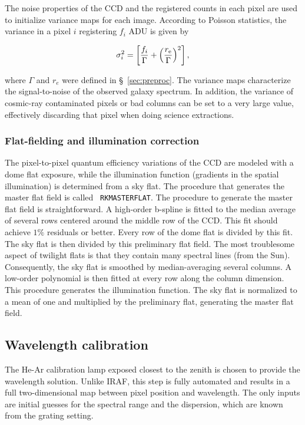 \documentclass[12pt,preprint]{aastex}
\begin{document}
The noise properties of the CCD and the registered counts in each
pixel are used to initialize variance maps for each image.  According
to Poisson statistics, the variance in a pixel $i$ registering $f_{i}$
ADU is given by

\begin{equation}
\sigma_{i}^{2} = \left[ \frac{f_{i}}{\Gamma} + \left(\frac{r_{\rm
e}}{\Gamma}\right)^{2} \right],
\end{equation}

\noindent where $\Gamma$ and $r_{e}$ were defined in
\S~\ref{sec:preproc}.  The variance maps characterize the
signal-to-noise of the observed galaxy spectrum.  In addition, the
variance of cosmic-ray contaminated pixels or bad columns can be set
to a very large value, effectively discarding that pixel when doing
science extractions.

\subsubsection{Flat-fielding and illumination correction}\label{sec:flat}

The pixel-to-pixel quantum efficiency variations of the CCD are
modeled with a dome flat exposure, while the illumination function
(gradients in the spatial illumination) is determined from a sky flat.
The procedure that generates the master flat field is called {\tt
RKMASTERFLAT}.  The procedure to generate the master flat field is
straightforward.  A high-order b-spline is fitted to the median
average of several rows centered around the middle row of the CCD.
This fit should achieve $1\%$ residuals or better.  Every row of the
dome flat is divided by this fit.  The sky flat is then divided by
this preliminary flat field.  The most troublesome aspect of twilight
flats is that they contain many spectral lines (from the Sun).
Consequently, the sky flat is smoothed by median-averaging several
columns.  A low-order polynomial is then fitted at every row along the
column dimension.  This procedure generates the illumination
function.  The sky flat is normalized to a mean of one and multiplied
by the preliminary flat, generating the master flat field.


\subsection{Wavelength calibration}\label{sec:wave}

The He-Ar calibration lamp exposed closest to the zenith is chosen to
provide the wavelength solution.  Unlike IRAF, this step is fully
automated and results in a full two-dimensional map between pixel
position and wavelength.  The only inputs are initial guesses for the
spectral range and the dispersion, which are known from the grating
setting.  
\end{document}
